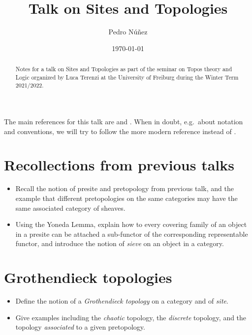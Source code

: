 \documentclass[12pt,a4paper]{amsart}
\title[Talk on Sites and Topologies]{Talk on Sites and Topologies}
\author[Pedro N\'{u}\~{n}ez]{Pedro N\'{u}\~{n}ez}
\date{\today}
\theoremstyle{plain}
\theoremstyle{definition}
\theoremstyle{remark}
\begin{document}
\maketitle

\begin{abstract}
  Notes for a talk on Sites and Topologies as part of the seminar on Topos theory and Logic organized by Luca Terenzi at the University of Freiburg during the Winter Term 2021/2022.
\end{abstract}

\tableofcontents


The main references for this talk are \cite{sga4} and \cite{stacks-project}.
When in doubt, e.g.~about notation and conventions, we will try to follow the more modern reference \cite{stacks-project} instead of \cite{sga4}.

\section{Recollections from previous talks}

\begin{itemize}
  \item Recall the notion of presite and pretopology from previous talk, and the example that different pretopologies on the same categories may have the same associated category of sheaves.
  \item Using the Yoneda Lemma, explain how to every covering family of an object in a presite can be attached a sub-functor of the corresponding representable functor, and introduce the notion of \textit{sieve} on an object in a category.
\end{itemize}

\section{Grothendieck topologies}

\begin{itemize}
  \item Define the notion of a \textit{Grothendieck topology} on a category and of \textit{site}.
  \item Give examples including the \textit{chaotic} topology, the \textit{discrete} topology, and the topology \textit{associated} to a given pretopology.
\end{itemize}
\end{document}
